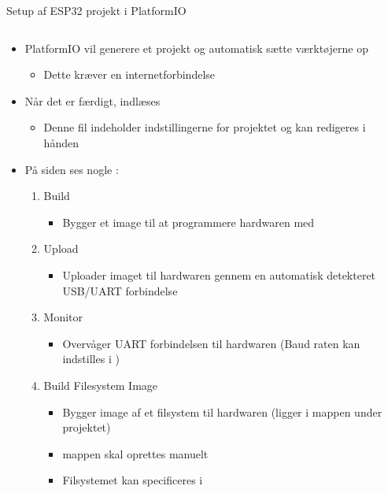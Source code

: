 \documentclass[aspectratio=169]{beamer}
\begin{document}
\begin{frame}{Setup af ESP32 projekt i PlatformIO}
\begin{columns}
	\begin{column}{0.5\textwidth}
		\begin{textBox}
			\begin{itemize}
				\item PlatformIO vil generere et projekt og automatisk sætte værktøjerne op
				\begin{itemize}
					\item Dette kræver en internetforbindelse
				\end{itemize}
				\item Når det er færdigt, indlæses 
				\begin{itemize}
					\item Denne fil indeholder indstillingerne for projektet og kan redigeres i hånden
				\end{itemize}
				\item På siden ses nogle :
				\begin{enumerate}
					\item Build
					\begin{itemize}
						\item Bygger et image til at programmere hardwaren med
					\end{itemize}
					\item Upload
					\begin{itemize}
						\item Uploader imaget til hardwaren gennem en automatisk detekteret USB/UART forbindelse
					\end{itemize}
					\item Monitor
					\begin{itemize}
						\item Overvåger UART forbindelsen til hardwaren (Baud raten kan indstilles i )
					\end{itemize}
					\item Build Filesystem Image
					\begin{itemize}
						\item Bygger image af et filsystem til hardwaren (ligger i  mappen under projektet)
						\item {} mappen skal oprettes manuelt
						\item Filsystemet kan specificeres i 
					\end{itemize}

\end{enumerate}
\end{itemize}
\end{textBox}
\end{column}
\end{columns}
\end{frame}
\end{document}
